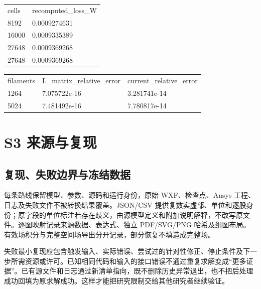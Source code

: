 \documentclass[journal,10pt]{IEEEtran}
\begin{document}
\begin{table}[!htbp]
\par
\begingroup\footnotesize\begin{tabular}{p{84.9mm}|p{84.9mm}}
\toprule
cells & recomputed\_\allowbreak loss\_\allowbreak W\\
8192 & 0.0009274631\\
16000 & 0.0009335389\\
27648 & 0.0009369268\\
27648 & 0.0009369268\\
\bottomrule\end{tabular}\endgroup
\end{table}
\begin{table}[!htbp]
\par
\begingroup\footnotesize\begin{tabular}{p{55.26666666666667mm}|p{55.26666666666667mm}|p{55.26666666666667mm}}
\toprule
filaments & L\_\allowbreak matrix\_\allowbreak relative\_\allowbreak error & current\_\allowbreak relative\_\allowbreak error\\
1264 & 7.075722e-16 & 3.281741e-14\\
5024 & 7.481492e-16 & 7.780817e-14\\
\bottomrule\end{tabular}\endgroup
\end{table}
\FloatBarrier
\section*{S3 来源与复现}
\hypertarget{chapter-S3}{}
\subsection*{复现、失败边界与冻结数据}
\hypertarget{S3.report_repro.heading}{}
每条路线保留模型、参数、源码和运行身份，原始 WXF、检查点、Ansys 工程、日志及失败文件不被转换结果覆盖。JSON/CSV 提供复数实虚部、单位和逐股身份；原字段的单位标注若存在歧义，由源模型定义和附加说明解释，不改写原文件。逐图映射记录来源数据、表达式、独立 PDF/SVG/PNG 哈希及组图布局。有效场积分与完整空间场导出分开记录，部分恢复不填造成完整场。


失败最小复现应包含触发输入、实际错误、尝试过的针对性修正、停止条件及下一步所需资源或许可。已知相同代码和输入的接口错误不通过重复求解变成“更多证据”。已有源文件和日志通过新清单指向，既不删除历史异常退出，也不把后处理成功回填为原求解成功。这样才能把研究限制交给其他研究者继续验证。
\end{document}
